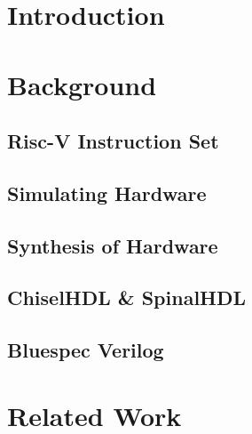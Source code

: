 \documentclass[a4paper,9pt]{report}
\begin{document}
\pagestyle{empty}
\singlespacing

\onehalfspacing

\singlespacing


\setcounter{page}{0}
\pagestyle{plain}
\tableofcontents
\listoffigures
\listoftables

\onehalfspacing


\chapter{Introduction}
\setcounter{page}{1} 






\chapter{Background} 
\section{Risc-V Instruction Set}

\section{Simulating Hardware}

\section{Synthesis of Hardware}

\section{ChiselHDL \& SpinalHDL}
\section{Bluespec Verilog}

\chapter{Related Work} 
\end{document}
